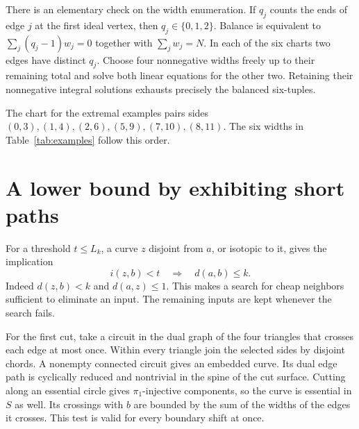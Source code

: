 \documentclass[11pt,a4paper]{article}
\begin{document}
There is an elementary check on the width enumeration. If \(q_j\) counts the
ends of edge \(j\) at the first ideal vertex, then \(q_j\in\{0,1,2\}\).
Balance is equivalent to \(\sum_j(q_j-1)w_j=0\) together with \(\sum_jw_j=N\).
In each of the six charts two edges have distinct \(q_j\). Choose four
nonnegative widths freely up to their remaining total and solve both linear
equations for the other two. Retaining their nonnegative integral solutions
exhausts precisely the balanced six-tuples.

\begin{center}

{\small The chart for the extremal examples pairs sides
\((0,3),(1,4),(2,6),(5,9),(7,10),(8,11)\).
The six widths in Table~\ref{tab:examples} follow this order.}
\end{center}

\clearpage
\section{A lower bound by exhibiting short paths}
For a threshold \(t\le L_k\), a curve \(z\) disjoint from \(a\), or isotopic to
it, gives the implication
\[
              i(z,b)<t \quad\Longrightarrow\quad d(a,b)\le k.
              \tag{1}\label{eq:sieve}
\]
Indeed \(d(z,b)<k\) and \(d(a,z)\le1\). This makes a search for cheap
neighbors sufficient to eliminate an input. The remaining inputs are kept
whenever the search fails.

For the first cut, take a circuit in the dual graph of the four triangles
that crosses each edge at most once. Within every triangle join the selected
sides by disjoint chords. A nonempty connected circuit gives an embedded
curve. Its dual edge path is cyclically reduced and nontrivial in the spine
of the cut surface. Cutting along an essential circle gives
\(\pi_1\)-injective components, so the curve is essential in \(S\) as well.
Its crossings with \(b\) are bounded by the sum of the widths of the edges
it crosses. This test is valid for every boundary shift at once.
\end{document}
